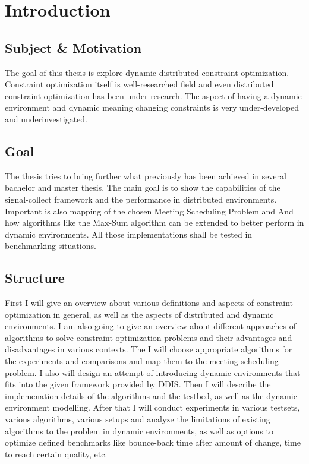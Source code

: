 \chapter{Introduction}

\section{Subject \& Motivation}
The goal of this thesis is explore dynamic distributed constraint optimization. Constraint optimization itself is well-researched field and even distributed constraint optimization has been under research. The aspect of having a dynamic environment and dynamic meaning changing constraints is very under-developed and underinvestigated.\newline

\section{Goal}
The thesis tries to bring further what previously has been achieved in several bachelor and master thesis. The main goal is to show the capabilities of the signal-collect framework and the performance in distributed environments. Important is also mapping of the chosen Meeting Scheduling Problem and And how algorithms like the Max-Sum algorithm can be extended to better perform in dynamic environments. All those implementations shall be tested in benchmarking situations.\newline

\section{Structure}
First I will give an overview about various definitions and aspects of constraint optimization in general, as well as the aspects of  distributed and dynamic environments. I am also going to give an overview about different approaches of algorithms to solve constraint optimization problems and their advantages and disadvantages in various contexts. The I will choose appropriate algorithms for the experiments and comparisons and map them to the meeting scheduling problem. I also will design an attempt of introducing dynamic environments that fits into the given framework provided by DDIS. Then I will describe the implemenation details of the algorithms and the testbed, as well as the  dynamic environment modelling. After that I will conduct experiments in various testsets, various algorithms, various setups and analyze the limitations of existing algorithms to the problem in dynamic environments, as well as options to optimize defined benchmarks like bounce-back time after amount of change, time to reach certain quality, etc.
